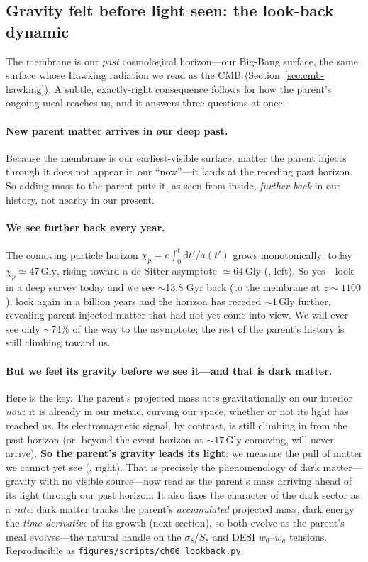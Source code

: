 \subsection{Gravity felt before light seen: the look-back dynamic}
\label{sec:lookback}

The membrane is our \emph{past} cosmological horizon---our Big-Bang surface, the
same surface whose Hawking radiation we read as the CMB (Section~\ref{sec:cmb-hawking}).
A subtle, exactly-right consequence follows for how the parent's ongoing meal reaches
us, and it answers three questions at once.

\paragraph{New parent matter arrives in our deep past.} Because the membrane is our
earliest-visible surface, matter the parent injects through it does not appear in our
``now''---it lands at the receding past horizon. So adding mass to the parent puts it,
as seen from inside, \emph{further back} in our history, not nearby in our present.

\paragraph{We see further back every year.} The comoving particle horizon
$\chi_p = c\!\int_0^t \mathrm{d}t'/a(t')$ grows monotonically: today
$\chi_p\simeq47\,\mathrm{Gly}$, rising toward a de Sitter asymptote
$\simeq64\,\mathrm{Gly}$ (, left). So yes---look in a deep survey
today and we see $\sim$13.8 Gyr back (to the membrane at $z\sim1100$); look again in
a billion years and the horizon has receded $\sim1\,\mathrm{Gly}$ further, revealing
parent-injected matter that had not yet come into view. We will ever see only
$\sim$74\% of the way to the asymptote; the rest of the parent's history is still
climbing toward us.

\paragraph{But we feel its gravity before we see it---and that is dark matter.} Here
is the key. The parent's projected mass acts gravitationally on our interior
\emph{now}: it is already in our metric, curving our space, whether or not its light
has reached us. Its electromagnetic signal, by contrast, is still climbing in from
the past horizon (or, beyond the event horizon at $\sim17\,\mathrm{Gly}$ comoving,
will never arrive). \textbf{So the parent's gravity leads its light}: we measure the
pull of matter we cannot yet see (, right). That is precisely the
phenomenology of dark matter---gravity with no visible source---now read as the
parent's mass arriving ahead of its light through our past horizon. It also fixes the
character of the dark sector as a \emph{rate}: dark matter tracks the parent's
\emph{accumulated} projected mass, dark energy the \emph{time-derivative} of its
growth (next section), so both evolve as the parent's meal evolves---the natural
handle on the $\sigma_8$/$S_8$ and DESI $w_0$--$w_a$ tensions. Reproducible as
\texttt{figures/scripts/ch06\_lookback.py}.

